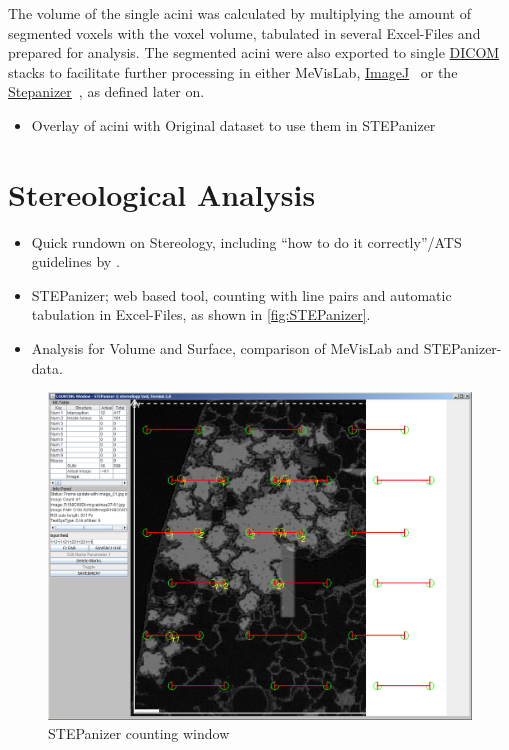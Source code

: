 \documentclass[%
	draft=true,
	paper=a4,%
	twoside=true,%
	abstract=true]{scrartcl}
\newcommand{\imsize}{\linewidth}
\begin{document}
The volume of the single acini was calculated by multiplying the amount of segmented voxels with the voxel volume, tabulated in several Excel-Files and prepared for analysis. The segmented acini were also exported to single \href{https://secure.wikimedia.org/wikipedia/en/w/index.php?title=Digital_Imaging_and_Communications_in_Medicine&oldid=415023605}{DICOM} stacks to facilitate further processing in either MeVisLab, \href{http://rsbweb.nih.gov/ij/}{ImageJ}~\cite{Abramoff2004} or the \href{http://stepanizer.com/}{Stepanizer}~\cite{Tschanz2011}, as defined later on.

\begin{itemize}
	\item Overlay of acini with Original dataset to use them in STEPanizer
\end{itemize}

\section{Stereological Analysis}
\begin{itemize}
	\item Quick rundown on Stereology, including “how to do it correctly”/ATS guidelines by \citet{Hsia2010}.
	\item STEPanizer; web based tool, counting with line pairs and automatic tabulation in Excel-Files, as shown in \autoref{fig:STEPanizer}.
	\item Analysis for Volume and Surface, comparison of MeVisLab and STEPanizer-data.
\end{itemize}

\renewcommand{\imsize}{\linewidth}
\begin{figure}
	\centering
	\includegraphics[width=\imsize]{img/CountingWindowSTEPanizer}
	\caption{STEPanizer counting window}
	\label{fig:STEPanzier}
\end{figure}
\end{document}
